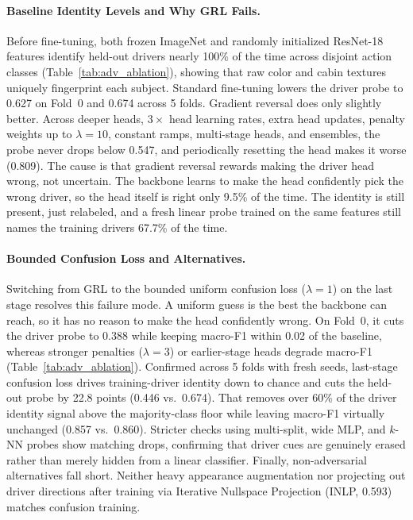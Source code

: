 \paragraph{Baseline Identity Levels and Why GRL Fails.}
Before fine-tuning, both frozen ImageNet and randomly initialized ResNet-18 features identify held-out drivers nearly 100\% of the time across disjoint action classes (Table~\ref{tab:adv_ablation}), showing that raw color and cabin textures uniquely fingerprint each subject. Standard fine-tuning lowers the driver probe to 0.627 on Fold~0 and 0.674 across 5 folds. Gradient reversal does only slightly better. Across deeper heads, $3\times$ head learning rates, extra head updates, penalty weights up to $\lambda{=}10$, constant ramps, multi-stage heads, and ensembles, the probe never drops below 0.547, and periodically resetting the head makes it worse (0.809). The cause is that gradient reversal rewards making the driver head wrong, not uncertain. The backbone learns to make the head confidently pick the wrong driver, so the head itself is right only 9.5\% of the time. The identity is still present, just relabeled, and a fresh linear probe trained on the same features still names the training drivers 67.7\% of the time.

\paragraph{Bounded Confusion Loss and Alternatives.}
Switching from GRL to the bounded uniform confusion loss ($\lambda{=}1$) on
the last stage resolves this failure mode. A uniform guess is the best the backbone
can reach, so it has no reason to make the head confidently wrong. On Fold~0, it cuts the driver probe to
0.388 while keeping macro-F1 within 0.02 of the baseline, whereas stronger penalties
($\lambda{=}3$) or earlier-stage heads degrade macro-F1
(Table~\ref{tab:adv_ablation}). Confirmed across 5 folds with fresh seeds,
last-stage confusion loss drives training-driver identity down to chance and cuts
the held-out probe by 22.8 points (0.446 vs.\ 0.674). That removes
over 60\% of the driver identity signal above the majority-class floor while
leaving macro-F1 virtually unchanged (0.857 vs.\ 0.860). Stricter checks using
multi-split, wide MLP, and $k$-NN probes show matching drops, confirming that
driver cues are genuinely erased rather than merely hidden from a linear
classifier. Finally, non-adversarial alternatives fall short. Neither heavy
appearance augmentation nor projecting out driver directions after training
via Iterative Nullspace Projection (INLP, 0.593) matches confusion
training.

